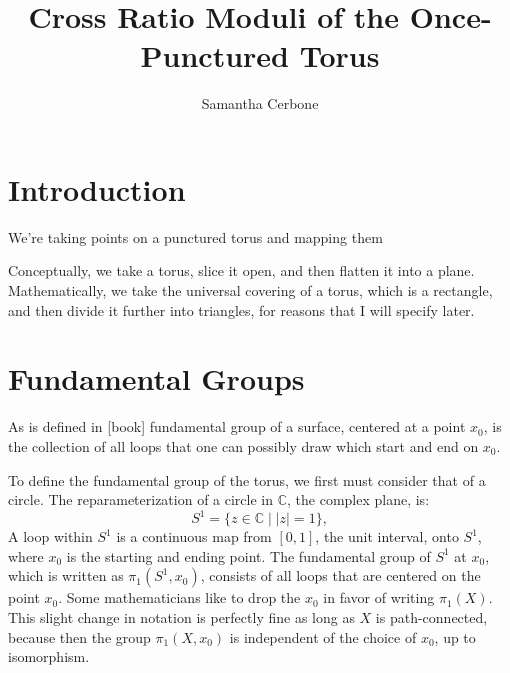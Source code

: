 \documentclass[12pt,a4paper,reqno,parskip=full]{amsart}
\numberwithin{equation}{section}
\theoremstyle{plain}
\theoremstyle{definition}
\def\C{{\mathbb C}}
\begin{document}
\title{Cross Ratio Moduli of the Once-Punctured Torus}

\author{Samantha Cerbone}

\maketitle

\section{Introduction}

We're taking points on a punctured torus and mapping them 

Conceptually, we take a torus, slice it open, and then flatten it into a plane. Mathematically, we take the universal covering of a torus, which is a rectangle, and then divide it further into triangles, for reasons that I will specify later.

\section{Fundamental Groups}

As is defined in [book] fundamental group of a surface, centered at a point $x_0$, is the collection of all loops that one can possibly draw which start and end on $x_0$. %

To define the fundamental group of the torus, we first must consider that of a circle. The reparameterization of a circle in $\C$, the complex plane, is:
\[S^1=\{z\in\C\mid |z|=1\},\]
A loop within $S^1$ is a continuous map from $[0,1]$, the unit interval, onto $S^1$, where $x_0$ is the starting and ending point. The fundamental group of $S^1$ at $x_0$, which is written as $\pi_1(S^1,x_0)$, consists of all loops that are centered on the point $x_0$. Some mathematicians like to drop the $x_0$ in favor of writing $\pi_1(X)$. This slight change in notation is perfectly fine as long as $X$ is path-connected, because then the group $\pi_1(X,x_0)$ is independent of the choice of $x_0$, up to isomorphism.
\end{document}
